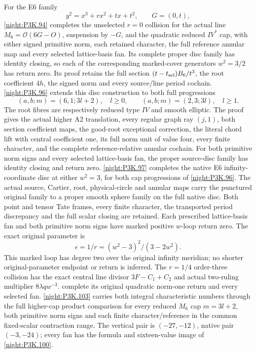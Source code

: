 \begin{theorem}
For the E6 family
\[
 y^2=x^3+rx^2+tx+t^2,\qquad G=(0,t),
\]
\cref{night:P3K.94} completes the unselected \(r=0\) collision for the actual
line \(M_6=\mathcal O(6G-O)\), suspension by \(-G\), and the
quadratic reduced \(IV^*\) cap, with either signed primitive norm,
each retained character, the full reference annular map and every
selected lattice-basis fan. Its complete proper disc family has
identity closing, so each of the corresponding marked-cover
generators \(w^2=3/2\) has return zero. Its proof retains the full
section \((t-t_{\rm sel})B_6/t^3\), the root coefficient \(4h\),
the signed norm and every source/line period cochain.
\cref{night:P3K.96} extends this disc construction to both full progressions
\[
 (a,b;m)=(6,1;3l+2),\quad l\ge0,
 \qquad (a,b;m)=(2,3;3l),\quad l\ge1.
\]
The root fibres are respectively reduced type \(IV\) and smooth
elliptic. The proof gives the actual higher A2 translation, every
regular graph ray \((j,1)\), both section coefficient maps, the
good-root exceptional correction, the literal chord lift with central
coefficient one, its full norm unit of value four, every finite
character, and the complete reference-relative annular cochain.
For both primitive norm signs and every selected lattice-basis fan,
the proper source-disc family has identity closing and return zero.
\cref{night:P3K.97} completes the native E6 infinity-coordinate disc at either
\(w^2=3\), for both cap progressions of \cref{night:P3K.96}. The actual source,
Cartier, root, physical-circle and annular maps carry the punctured
original family to a proper smooth sphere family on the full native
disc. Both point and tensor Tate frames, every finite character,
the transported period discrepancy and the full scalar closing are
retained. Each prescribed lattice-basis fan and both primitive norm
signs have marked positive \(w\)-loop return zero. The exact original
parameter is
\[
 \epsilon=1/r=(w^2-3)^2/(3-2w^2).
\]
This marked loop has degree two over the original infinity meridian;
no shorter original-parameter endpoint or return is inferred.
The \(r=1/4\) order-three collision has the exact central line
divisor \(3F-C_1+C_2\) and actual two-ruling multiplier
\(8\lambda q w^{-3}\).  complete its original
quadratic norm-one return and every selected fan. \cref{night:P3K.103} carries
both integral characteristic numbers through the full higher-cap
product comparison for every reduced \(M_6\) cap \(m=3l+2\),
both primitive norm signs and each finite character/reference in
the common fixed-scalar contraction range. The vertical pair is
\((-27,-12)\), native pair \((-3,-24)\); every fan has the
formula and sixteen-value image of \cref{night:P3K.100}.


\end{theorem}
